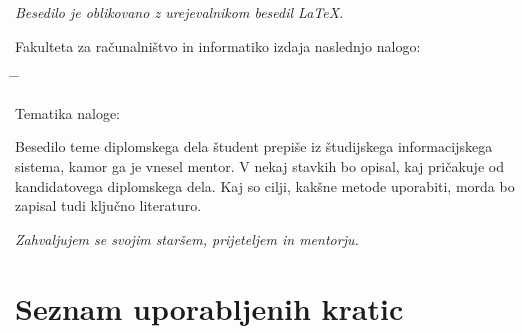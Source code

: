 \documentclass[a4paper, 12pt]{book}
\newcommand{\clearemptydoublepage}{\newpage{\pagestyle{empty}\cleardoublepage}}
\begin{document}
\begin{center}
\mbox{}\vfill
\emph{Besedilo je oblikovano z urejevalnikom besedil \LaTeX.}
\end{center}
\clearemptydoublepage

\thispagestyle{empty}
\vspace*{4cm}

\noindent
Fakulteta za računalništvo in informatiko izdaja naslednjo nalogo:
\medskip
\begin{tabbing}
\hspace{32mm}\= \hspace{6cm} \= \kill




Tematika naloge:
\end{tabbing}
Besedilo teme diplomskega dela študent prepiše iz študijskega informacijskega sistema, kamor ga je vnesel mentor. V nekaj stavkih bo opisal, kaj pričakuje od kandidatovega diplomskega dela. Kaj so cilji, kakšne metode uporabiti, morda bo zapisal tudi ključno literaturo.
\vspace{15mm}






\vspace{2cm}

\clearemptydoublepage

\thispagestyle{empty}\mbox{}\vfill\null\it%
\noindent
Zahvaljujem se svojim staršem, prijeteljem in mentorju.
\rm\normalfont

\clearemptydoublepage


\clearemptydoublepage


\pagestyle{empty}
\def\thepage{}%
\tableofcontents{}


\clearemptydoublepage


\chapter*{Seznam uporabljenih kratic}  %
\end{document}
